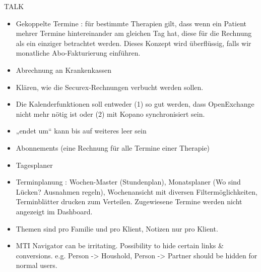 \documentclass[letterpaper,10pt,ngerman]{sphinxmanual}
\begin{document}
TALK
\begin{itemize}
\item {} 
Gekoppelte Termine : für bestimmte Therapien gilt, dass wenn ein
Patient mehrer Termine hintereinander am gleichen Tag hat, diese für
die Rechnung als ein einziger betrachtet werden.  Dieses Konzept
wird überflüssig, falls wir monatliche Abo-Fakturierung einführen.

\item {} 
Abrechnung an Krankenkassen

\item {} 
Klären, wie die Securex-Rechnungen verbucht werden sollen.

\item {} 
Die Kalenderfunktionen soll entweder (1) so gut werden, dass
OpenExchange nicht mehr nötig ist oder (2) mit Kopano synchronisiert
sein.

\item {} 
„endet um“ kann bis auf weiteres leer sein

\item {} 
Abonnements (eine Rechnung für alle Termine einer Therapie)

\item {} 
Tagesplaner

\item {} 
Terminplanung : Wochen-Master (Stundenplan), Monatsplaner (Wo sind
Lücken? Ausnahmen regeln), Wochenansicht mit diversen
Filtermöglichkeiten, Terminblätter drucken zum
Verteilen. Zugewiesene Termine werden nicht angezeigt im Dashboard.

\item {} 
Themen sind pro Familie und pro Klient, Notizen nur pro Klient.

\item {} 
MTI Navigator can be irritating. Possibility to hide certain links \&
conversions. e.g. Person -\textgreater{} Houshold, Person -\textgreater{} Partner should be
hidden for normal users.

\end{itemize}
\end{document}
